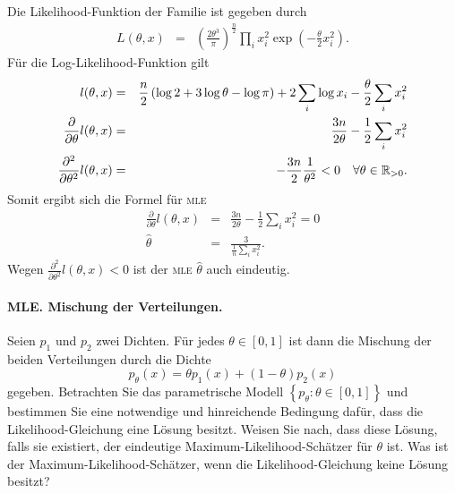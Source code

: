Die Likelihood-Funktion der Familie ist gegeben durch
\begin{eqnarray}
	L(\theta, x) &=& \left( \frac{2\theta^3}{\pi} \right)^\frac{n}{2} 
	\prod_i x_i^2 \exp\left( - \frac{\theta}{2}x_i^2 \right).
\end{eqnarray}
Für die Log-Likelihood-Funktion gilt
\begin{eqnarray}
	l(\theta,x) &=& \frac{n}{2}\left( \log 2 + 3 \log \theta - \log \pi \right) + 2\sum_{i}^{} \log x_i - \frac{\theta}{2}\sum_{i}^{} x_i^2 \\
	\frac{\partial}{\partial \theta} l(\theta,x) &=& 
	\frac{3n}{2 \theta}  - \frac{1}{2}\sum_{i}^{} x_i^2 \\
	\frac{\partial^2}{\partial \theta^2} l(\theta,x) &=& - \frac{3n}{2} \frac{1}{\theta^2} < 0 \quad \forall \theta\in\mathbb R_{>0}.
\end{eqnarray}
Somit ergibt sich die Formel für \textsc{mle} 
\begin{eqnarray}
	\frac{\partial}{\partial \theta} l(\theta,x) &=& \frac{3n}{2 \theta}  - \frac{1}{2}\sum_{i}^{} x_i^2 = 0 \\
	\hat\theta &=&  \frac{3}{\frac{1}{n} \sum_{i}^{} x_i^2}.
\end{eqnarray}
Wegen $ \frac{\partial^2}{\partial \theta^2} l(\theta,x) <0$ ist der \textsc{mle} $\hat\theta$ auch eindeutig.





\paragraph{MLE. Mischung der Verteilungen. }
Seien $p_1$ und $p_2$ zwei Dichten. Für jedes $\theta\in\left[ 0,1 \right]$ ist dann die Mischung
der beiden Verteilungen durch die Dichte
\begin{equation}
	p_\theta(x) = \theta p_1(x) + (1-\theta)p_2(x)
\end{equation}
gegeben. Betrachten Sie das parametrische Modell 
$\left\{ p_\theta : \theta \in \left[ 0,1 \right] \right\}$
und bestimmen Sie eine notwendige und hinreichende Bedingung dafür, dass die Likelihood-Gleichung
eine Lösung besitzt. Weisen Sie nach, dass diese Lösung, falls sie existiert, 
der eindeutige Maximum-Likelihood-Schätzer für $\theta$ ist. Was ist der Maximum-Likelihood-Schätzer,
wenn die Likelihood-Gleichung keine Lösung besitzt?

